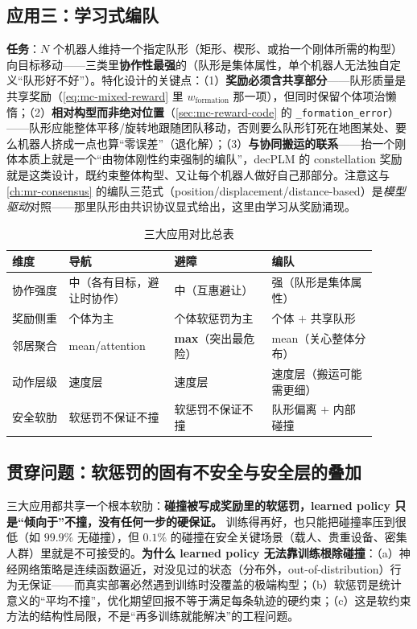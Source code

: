 \subsection{应用三：学习式编队}
\label{sec:mc-app-form}
\textbf{任务}：$N$ 个机器人维持一个指定队形（矩形、楔形、或抬一个刚体所需的构型）向目标移动——三类里\textbf{协作性最强}的（队形是集体属性，单个机器人无法独自定义“队形好不好”）。特化设计的关键点：（1）\textbf{奖励必须含共享部分}——队形质量是共享奖励（\cref{eq:mc-mixed-reward} 里 $w_{\text{formation}}$ 那一项），但同时保留个体项治懒惰；（2）\textbf{相对构型而非绝对位置}（\cref{sec:mc-reward-code} 的 \verb|_formation_error|）——队形应能整体平移/旋转地跟随团队移动，否则要么队形钉死在地图某处、要么机器人挤成一点也算“零误差”（退化解）；（3）\textbf{与协同搬运的联系}——抬一个刚体本质上就是一个“由物体刚性约束强制的编队”，decPLM 的 constellation 奖励就是这类设计\cite{pandit2025decplm}，既约束整体构型、又让每个机器人做好自己那部分。注意这与 \cref{ch:mr-consensus} 的编队三范式（position/displacement/distance-based）是\emph{模型驱动}对照——那里队形由共识协议显式给出，这里由学习从奖励涌现。

\begin{table}[H]\centering\small
\caption{三大应用对比总表}
\label{tab:mc-apps-compare}
\begin{tabular}{p{0.14\linewidth}p{0.26\linewidth}p{0.24\linewidth}p{0.26\linewidth}}
\toprule
维度 & 导航 & 避障 & 编队 \\
\midrule
协作强度 & 中（各有目标，避让时协作） & 中（互惠避让） & 强（队形是集体属性） \\
奖励侧重 & 个体为主 & 个体软惩罚为主 & 个体 $+$ 共享队形 \\
邻居聚合 & mean/attention & \textbf{max}（突出最危险） & mean（关心整体分布） \\
动作层级 & 速度层 & 速度层 & 速度层（搬运可能需更细） \\
安全软肋 & 软惩罚不保证不撞 & 软惩罚不保证不撞 & 队形偏离 $+$ 内部碰撞 \\
\bottomrule
\end{tabular}
\end{table}

\subsection{贯穿问题：软惩罚的固有不安全与安全层的叠加}
\label{sec:mc-safety-layer}

三大应用都共享一个根本软肋：\textbf{碰撞被写成奖励里的软惩罚，learned policy 只是“倾向于”不撞，没有任何一步的硬保证。} 训练得再好，也只能把碰撞率压到很低（如 $99.9\%$ 无碰撞），但 $0.1\%$ 的碰撞在安全关键场景（载人、贵重设备、密集人群）里就是不可接受的。\textbf{为什么 learned policy 无法靠训练根除碰撞}：（a）神经网络策略是连续函数逼近，对没见过的状态（分布外，out-of-distribution）行为无保证——而真实部署必然遇到训练时没覆盖的极端构型；（b）软惩罚是统计意义的“平均不撞”，优化期望回报不等于满足每条轨迹的硬约束；（c）这是软约束方法的结构性局限，不是“再多训练就能解决”的工程问题。

